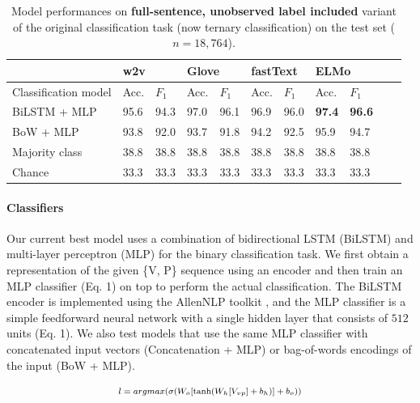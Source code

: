 \documentclass[letterpaper]{article} %
\begin{document}
\begin{table}[h]
	\centering
	\begin{tabular}{@{}lllllllllll@{}}
		\toprule
		& \multicolumn{2}{l}{w2v}  & \multicolumn{2}{l}{Glove} &  \multicolumn{2}{l}{fastText} & \multicolumn{2}{l}{ELMo}  \\ \midrule
		Classification model       & Acc. & $F_1$ & Acc. & $F_1$ & Acc. & $F_1$ & Acc. & $F_1$   \\ \midrule
		BiLSTM + MLP &  95.6  & 94.3 \hspace{1cm} & 97.0  & 96.1  \hspace{1cm} & 96.9 & 96.0  \hspace{1cm} & \textbf{97.4} & \textbf{96.6} \\
		BoW + MLP & 93.8 & 92.0& 93.7& 91.8& 94.2 & 92.5& 95.9 & 94.7 \\
		Majority class & 38.8 & 38.8 & 38.8 & 38.8 & 38.8 & 38.8 & 38.8 & 38.8 \\ 
		Chance       & 33.3  & 33.3  & 33.3 & 33.3 & 33.3 & 33.3 & 33.3  & 33.3  \\
		\bottomrule
	\end{tabular}
	\caption{Model performances on \textbf{full-sentence, unobserved label included} variant of the original classification task (now ternary classification) on the test set ($n=18,764$).}
	\label{ex1-2:full sentence task}
\end{table}



\paragraph{Classifiers}
Our current best model uses a combination of bidirectional LSTM (BiLSTM) and multi-layer perceptron (MLP) for the binary classification task. We first obtain a representation of the given \{\textsc{V, P}\} sequence using an encoder and then train an MLP classifier (Eq. 1) on top to perform the actual classification. The BiLSTM encoder is implemented using the AllenNLP toolkit \cite{gardner2018allennlp}, and the MLP classifier is a simple feedforward neural network with a single hidden layer that consists of $512$ units (Eq. 1). We also test models that use the same MLP classifier with concatenated input vectors (Concatenation + MLP) or bag-of-words encodings of the input (BoW + MLP). 


\begin{equation}
\label{eq1}
\fontsize{7.5pt}{8.5pt}\selectfont
\begin{array}{ll}
l = argmax(\sigma(W_o [ \tanh(W_h[V_{vp}] + b_h)] + b_o))
\end{array}
\end{equation}
\end{document}

